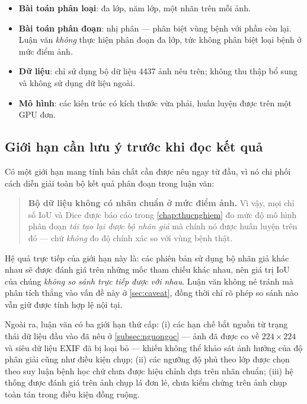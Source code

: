 \begin{itemize}
    \item \textbf{Bài toán phân loại}: đa lớp, năm lớp, một nhãn trên mỗi ảnh.
    \item \textbf{Bài toán phân đoạn}: nhị phân --- phân biệt vùng bệnh với phần
          còn lại. Luận văn \emph{không} thực hiện phân đoạn đa lớp, tức không
          phân biệt loại bệnh ở mức điểm ảnh.
    \item \textbf{Dữ liệu}: chỉ sử dụng bộ dữ liệu \num{4437} ảnh nêu trên; không
          thu thập bổ sung và không sử dụng dữ liệu ngoài.
    \item \textbf{Mô hình}: các kiến trúc có kích thước vừa phải, huấn luyện được
          trên một GPU đơn.
\end{itemize}

\subsection{Giới hạn cần lưu ý trước khi đọc kết quả}
\label{subsec:gioihan-quantrong}

Có một giới hạn mang tính bản chất cần được nêu ngay từ đầu, vì nó chi phối cách
diễn giải toàn bộ kết quả phân đoạn trong luận văn:

\begin{quote}
\textbf{Bộ dữ liệu không có nhãn chuẩn ở mức điểm ảnh.} Vì vậy, mọi chỉ số IoU và
Dice được báo cáo trong \cref{chap:thucnghiem} đo mức độ mô hình phân đoạn
\emph{tái tạo lại được bộ nhãn giả} mà chính nó được huấn luyện trên đó --- chứ
\emph{không} đo độ chính xác so với vùng bệnh thật.
\end{quote}

Hệ quả trực tiếp của giới hạn này là: các phiên bản sử dụng bộ nhãn giả khác nhau
sẽ được đánh giá trên những mốc tham chiếu khác nhau, nên giá trị IoU của chúng
\emph{không so sánh trực tiếp được với nhau}. Luận văn không né tránh mà phân
tích thẳng vào vấn đề này ở \cref{sec:caveat}, đồng thời chỉ rõ phép so sánh nào
vẫn giữ được tính hợp lệ nội tại.

Ngoài ra, luận văn có ba giới hạn thứ cấp: (i) các hạn chế bắt nguồn từ trạng
thái dữ liệu đầu vào đã nêu ở \cref{subsec:nguongoc} --- ảnh đã được co về
$224 \times 224$ và siêu dữ liệu EXIF đã bị loại bỏ --- khiến không thể khảo sát
ảnh hưởng của độ phân giải cũng như điều kiện chụp; (ii) các ngưỡng độ phủ theo
lớp được chọn theo suy luận bệnh học chứ chưa được hiệu chỉnh dựa trên nhãn
chuẩn; (iii) hệ thống được đánh giá trên ảnh chụp lá đơn lẻ, chưa kiểm chứng
trên ảnh chụp toàn tán trong điều kiện đồng ruộng.

